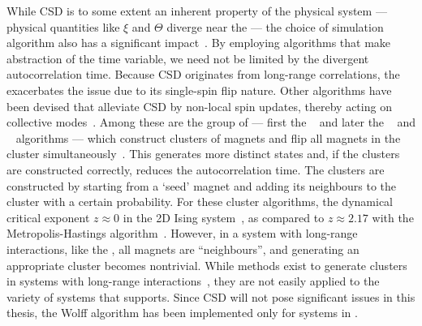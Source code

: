 While CSD is to some extent an inherent property of the physical system --- physical quantities like $\xi$ and $\Theta$ diverge near the  --- the choice of simulation algorithm also has a significant impact~\cite{PhD_Reynal}.
By employing algorithms that make abstraction of the time variable, we need not be limited by the divergent autocorrelation time. %
Because CSD originates from long-range correlations, the  exacerbates the issue due to its single-spin flip nature.
Other algorithms have been devised that alleviate CSD by non-local spin updates, thereby acting on collective modes~\cite{BeatCriticalSlowingDown1990}.
Among these are the group of  --- first the ~\cite{SwendsenWang} and later the ~\cite{niedermayer1988general} and ~\cite{Wolff} algorithms --- which construct clusters of magnets and flip all magnets in the cluster simultaneously~\cite{CompStatPhys}. %
This generates more distinct states and, if the clusters are constructed correctly, reduces the autocorrelation time.
The clusters are constructed by starting from a `seed' magnet and adding its neighbours to the cluster with a certain probability.
For these cluster algorithms, the dynamical critical exponent $z \approx 0$ in the 2D  Ising system~\cite{NumericalDynamicalNiedermayer}, as compared to $z\approx2.17$ with the Metropolis-Hastings algorithm~\cite{DynamicExponentMetropolis}.
However, in a system with long-range interactions, like the , all magnets are ``neighbours'', and generating an appropriate cluster becomes nontrivial.
While methods exist to generate clusters in systems with long-range interactions~\cite{MC_spinLongRange}, they are not easily applied to the variety of systems that \hotspice supports.
Since CSD will not pose significant issues in this thesis, the Wolff algorithm has been implemented only for  systems in \hotspice.


